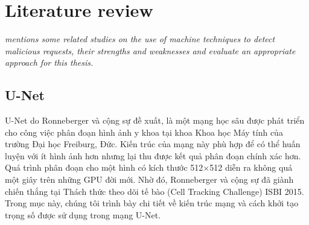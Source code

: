 \chapter{Literature review}
\label{chap:literaturereview}
	\textit{mentions some related studies on the use of machine techniques to detect malicious requests, their strengths and weaknesses and evaluate an appropriate approach for this thesis.}
	\minitoc

\section{U-Net}
\label{sec:u_net}
	U-Net do Ronneberger và cộng sự \cite{ronneberger2015u} đề xuất, là một mạng học sâu được phát triển cho công việc phân đoạn hình ảnh y khoa tại khoa Khoa học Máy tính của trường Đại học Freiburg, Đức. Kiến trúc của mạng này phù hợp để có thể huấn luyện với ít hình ảnh hơn nhưng lại thu được kết quả phân đoạn chính xác hơn. Quá trình phân đoạn cho một hình có kích thước 512$\times$512 diễn ra không quá một giây trên những GPU đời mới. Nhờ đó, Ronneberger và cộng sự đã giành chiến thắng tại Thách thức theo dõi tế bào (Cell Tracking Challenge) ISBI 2015. Trong mục này, chúng tôi trình bày chi tiết về kiến trúc mạng và cách khởi tạo trọng số được sử dụng trong mạng U-Net.
	
